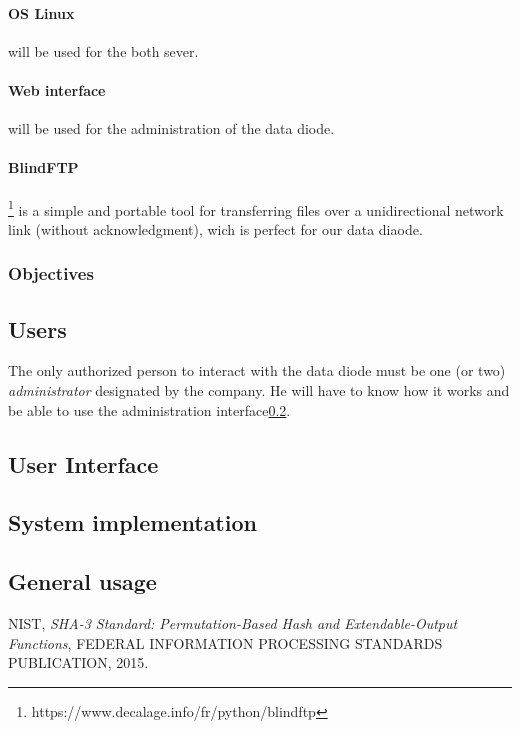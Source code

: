 \documentclass[a4paper,10pt]{article}
\begin{document}
\paragraph{OS Linux} will be used for the both sever.

\paragraph{Web interface} will be used for the administration of the data diode.

\paragraph{BlindFTP}\footnote{https://www.decalage.info/fr/python/blindftp} is a simple and portable tool for transferring files over a unidirectional network link (without acknowledgment), wich is perfect for our data diaode.

\subsubsection{Objectives}
\subsection{Users} 
The only authorized person to interact with the data diode must be one (or two) \textit{administrator} designated by the company. He will have to know how it works and be able to use the administration interface\ref{UI}.
\subsection{User Interface}\label{UI}

\subsection{System implementation}
\subsection{General usage}


\begin{thebibliography}{9}

NIST,
\textit{SHA-3 Standard: Permutation-Based Hash and Extendable-Output Functions},
FEDERAL INFORMATION PROCESSING STANDARDS PUBLICATION,
2015.

\end{thebibliography}
\end{document}
